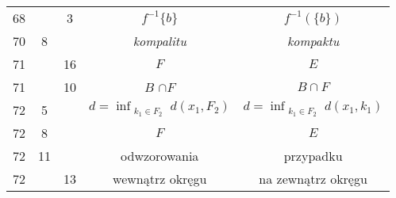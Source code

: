 \documentclass[a4paper,11pt]{article}
\begin{document}
\begin{center}
\begin{tabular}{|c|c|c|c|c|}
    68  & &  3 & $f^{ -1 } \{ b \}$ & $f^{ -1 }( \{ b \} )$ \\
    70  &  8 & & \emph{kompalitu} & \emph{kompaktu} \\
    71  & & 16 & $F$ & $E$ \\
    71  & & 10 & $B$ $\cap F$ & $B \cap F$ \\
    72  &  5 & & $d = \inf_{ \substack{ k_{ 1 } \in F_{ 2 } } } d( x_{ 1 },
                 F_{ 2 } )$ 
           & $d = \inf_{ \substack{ k_{ 1 } \in F_{ 2 } } } 
             d( x_{ 1 }, k_{ 1 } )$ \\
    72  &  8 & & $F$ & $E$ \\
    72  & 11 & & odwzorowania & przypadku \\
    72  & & 13 & wewnątrz okręgu & na zewnątrz okręgu \\
    \hline
  \end{tabular}


\end{center}
\end{document}
